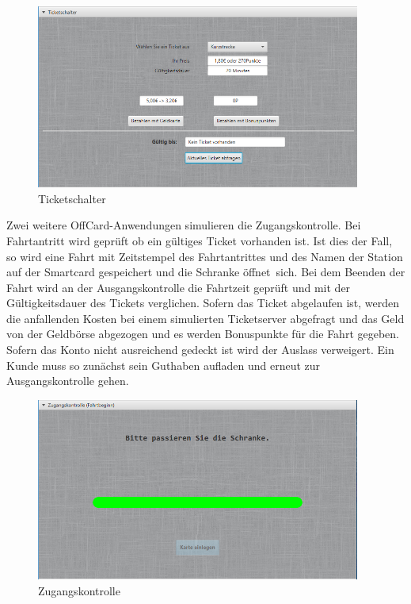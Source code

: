 \documentclass[	a4paper,
			11pt,
			oneside,
			parskip]{scrartcl}
\begin{document}
\begin{figure}[H]
	\centering
  	\includegraphics[width=0.95\textwidth]{img/ticket}
	\caption{Ticketschalter}
	\label{ticketoff}
\end{figure}

Zwei weitere OffCard-Anwendungen simulieren die Zugangskontrolle. Bei Fahrtantritt wird geprüft ob ein gültiges Ticket vorhanden ist. Ist dies der Fall, so wird eine Fahrt mit Zeitstempel des Fahrtantrittes und des Namen der Station auf der Smartcard gespeichert und die Schranke \glqq öffnet\grqq\ sich. Bei dem Beenden der Fahrt wird an der Ausgangskontrolle die Fahrtzeit geprüft und mit der Gültigkeitsdauer des Tickets verglichen.
Sofern das Ticket abgelaufen ist, werden die anfallenden Kosten bei einem simulierten Ticketserver abgefragt und das Geld von der Geldbörse abgezogen und es werden Bonuspunkte für die Fahrt gegeben. Sofern das Konto nicht ausreichend gedeckt ist wird der Auslass verweigert. Ein Kunde muss so zunächst sein Guthaben aufladen und erneut zur Ausgangskontrolle gehen.

\begin{figure}[H]
	\centering
  	\includegraphics[width=0.95\textwidth]{img/gate}
	\caption{Zugangskontrolle}
	\label{gateoff}
\end{figure}
\end{document}
